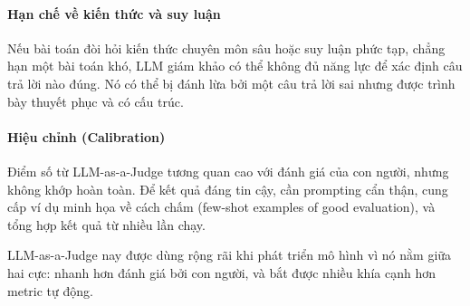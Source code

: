 \paragraph{Hạn chế về kiến thức và suy luận}
Nếu bài toán đòi hỏi kiến thức chuyên môn sâu hoặc suy luận phức tạp, chẳng hạn một bài toán khó, LLM giám khảo có thể không đủ năng lực để xác định câu trả lời nào đúng. Nó có thể bị đánh lừa bởi một câu trả lời sai nhưng được trình bày thuyết phục và có cấu trúc.

\paragraph{Hiệu chỉnh (Calibration)}
Điểm số từ LLM-as-a-Judge tương quan cao với đánh giá của con người, nhưng không khớp hoàn toàn. Để kết quả đáng tin cậy, cần prompting cẩn thận, cung cấp ví dụ minh họa về cách chấm (few-shot examples of good evaluation), và tổng hợp kết quả từ nhiều lần chạy.

LLM-as-a-Judge nay được dùng rộng rãi khi phát triển mô hình vì nó nằm giữa hai cực: nhanh hơn đánh giá bởi con người, và bắt được nhiều khía cạnh hơn metric tự động.

